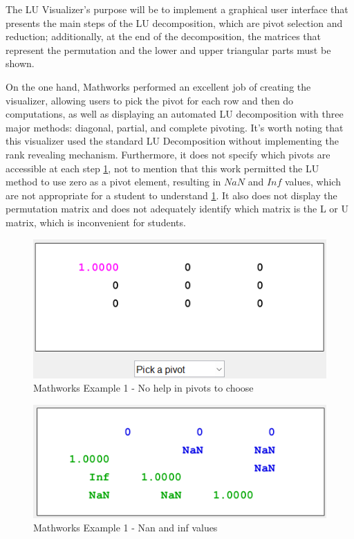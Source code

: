 The LU Visualizer's purpose will be to implement a graphical user interface that presents the main steps of the LU decomposition, which are pivot selection and reduction; additionally, at the end of the decomposition, the matrices that represent the permutation and the lower and upper triangular parts must be shown. 

On the one hand, Mathworks performed an excellent job of creating the visualizer, allowing users to pick the pivot for each row and then do computations, as well as displaying an automated LU decomposition with three major methods: diagonal, partial, and complete pivoting. It's worth noting that this visualizer used the standard LU Decomposition without implementing the rank revealing mechanism. Furthermore, it does not specify which pivots are accessible at each step \ref{fig:Mathworks Example 1 - No help in pivots to choose}, not to mention that this work permitted the LU method to use zero as a pivot element, resulting in $NaN$ and $Inf$ values, which are not appropriate for a student to understand \ref{fig:Mathworks Example 1 - No help in pivots to choose}. It also does not display the permutation matrix and does not adequately identify which matrix is the L or U matrix, which is inconvenient for students.

 
\begin{figure}[H]
    \centering
    \includegraphics[scale=0.6]{Include/Images/Thesis/Development/Visualizers/LU VISUALIZER/Mathworks.LU.Ex1.png}
    \caption{Mathworks Example 1 - No help in pivots to choose}
    \label{fig:Mathworks Example 1 - No help in pivots to choose}
\end{figure}

\begin{figure}[H]
    \centering
    \includegraphics[scale=0.6]{Include/Images/Thesis/Development/Visualizers/LU VISUALIZER/Mathworks.LU.Ex1.1.png}
    \caption{Mathworks Example 1 - Nan and inf values}
    \label{fig:Mathworks Example 1 - Nan and inf values}
\end{figure}


